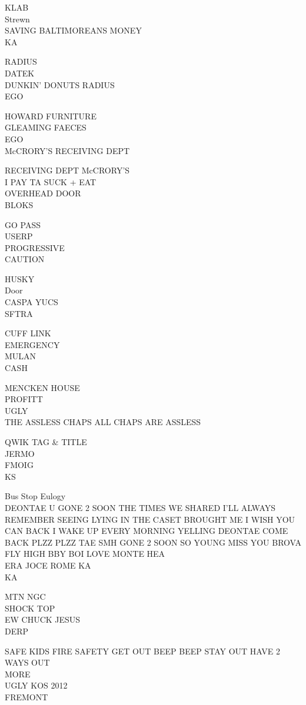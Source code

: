 \documentclass[10pt,letterpaper]{article}
\begin{document}
KLAB\\
Strewn\\
SAVING BALTIMOREANS MONEY\\
KA

RADIUS\\
DATEK\\
DUNKIN' DONUTS RADIUS\\
EGO

HOWARD FURNITURE\\
GLEAMING FAECES\\
EGO\\
McCRORY'S RECEIVING DEPT

RECEIVING DEPT McCRORY'S\\
I PAY TA SUCK + EAT\\
OVERHEAD DOOR\\
BLOKS

GO PASS\\
USERP\\
PROGRESSIVE\\
CAUTION

HUSKY\\
Door\\
CASPA YUCS\\
SFTRA

CUFF LINK\\
EMERGENCY\\
MULAN\\
CASH

MENCKEN HOUSE\\
PROFITT\\
UGLY\\
THE ASSLESS CHAPS ALL CHAPS ARE ASSLESS

QWIK TAG \& TITLE\\
JERMO\\
FMOIG\\
KS

Bus Stop Eulogy\\
DEONTAE U GONE 2 SOON THE TIMES WE SHARED I'LL ALWAYS REMEMBER SEEING LYING IN THE CASET BROUGHT ME I WISH YOU CAN BACK I WAKE UP EVERY MORNING YELLING DEONTAE COME BACK PLZZ PLZZ TAE SMH GONE 2 SOON SO YOUNG MISS YOU BROVA FLY HIGH BBY BOI LOVE MONTE HEA\\
ERA JOCE ROME KA\\
KA

MTN NGC\\
SHOCK TOP\\
EW CHUCK JESUS\\
DERP

SAFE KIDS FIRE SAFETY GET OUT BEEP BEEP STAY OUT HAVE 2 WAYS OUT\\
MORE\\
UGLY KOS 2012\\
FREMONT
\end{document}
